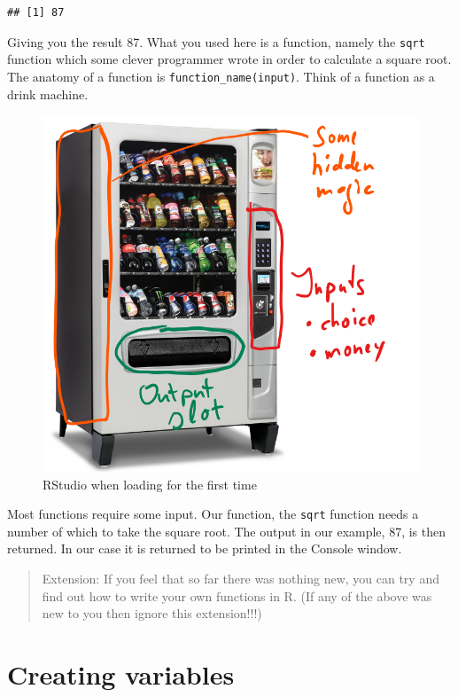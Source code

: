 \documentclass[
]{article}
\begin{document}
\begin{verbatim}
## [1] 87
\end{verbatim}

Giving you the result 87. What you used here is a function, namely the
\texttt{sqrt} function which some clever programmer wrote in order to
calculate a square root. The anatomy of a function is
\texttt{function\_name(input)}. Think of a function as a drink machine.

\begin{figure}
\centering
\includegraphics{DrinkMachine.png}
\caption{RStudio when loading for the first time}
\end{figure}

Most functions require some input. Our function, the \texttt{sqrt}
function needs a number of which to take the square root. The output in
our example, 87, is then returned. In our case it is returned to be
printed in the Console window.

\begin{quote}
Extension: If you feel that so far there was nothing new, you can try
and find out how to write your own functions in R. (If any of the above
was new to you then ignore this extension!!!)
\end{quote}

\hypertarget{creating-variables}{%
\section{Creating variables}\label{creating-variables}}
\end{document}

